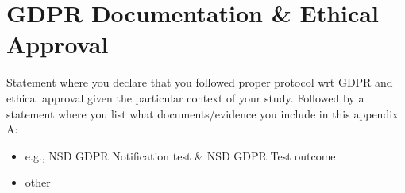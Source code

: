 \section{GDPR Documentation \& Ethical Approval}\label{app:A}

\appindent Statement where you declare that you followed proper protocol wrt GDPR and ethical approval given the particular context of your study. Followed by a statement where you list what documents/evidence you include in this appendix A:
\begin{itemize}
    \item e.g., NSD GDPR Notification test \& NSD GDPR Test outcome
    \item other
\end{itemize}



